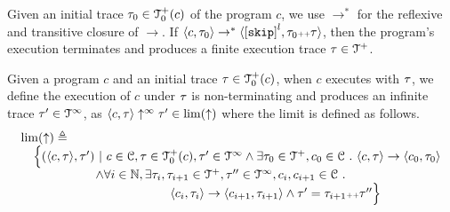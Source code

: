 Given an initial trace $\mathtt{\tau}_0 \in \mathcal{T}^{+}_0(c)$ of the program $c$,
we use $\to^*$ for the reflexive and transitive closure of $\to$. 
If $\config{c, \trace_0} \rightarrow^{*} \config{\clabel{\eskip}^l, \trace_0 \tracecat \trace}$,
then the program's execution terminates and produces a finite execution trace $\mathtt{\tau} \in \mathcal{T}^{+}$.
\\
\begin{defn}
  \label{def:non-terminating}
  Given a program $c$ and an initial trace $\mathtt{\tau} \in \mathcal{T}^{+}_0(c)$,
  when $c$ executes with $\mathtt{\tau}$,  we define the execution of $c$ under $\mathtt{\tau}$ is non-terminating and produces an infinite trace $\mathtt{\tau}' \in \mathcal{T}^{\infty}$, as 
  $\langle c, \mathtt{\tau} \rangle \uparrow^{\infty} \mathtt{\tau}' \in \lim(\uparrow)$
  where the limit is defined as follows.
  \[
    \begin{array}{l}
      \lim(\uparrow) 
      \triangleq 
    \\ \quad
    \Big\{
      (\langle c, \mathtt{\tau} \rangle, \mathtt{\tau}') ~\vert~ 
      c\in \mathcal{C}, \mathtt{\tau} \in \mathcal{T}^{+}_0(c),
      \mathtt{\tau}' \in \mathcal{T}^{\infty} 
      \land \exists \mathtt{\tau}_0 \in \mathcal{T}^{+}, c_0 \in \mathcal{C} ~.~ 
      \langle c, \mathtt{\tau} \rangle \to \langle c_0, \mathtt{\tau}_0 \rangle
      \\ \qquad \qquad \qquad 
      \land \forall i \in \mathbb{N}, \exists \mathtt{\tau}_i, \mathtt{\tau}_{i + 1} \in \mathcal{T}^{+}, \mathtt{\tau}'' \in \mathcal{T}^{\infty}, c_i, c_{i + 1} \in \mathcal{C} ~.~ 
      \\ \qquad \qquad \qquad 
      \qquad \qquad \qquad 
      \langle c_i, \mathtt{\tau}_i \rangle \to \langle c_{i + 1}, \mathtt{\tau}_{i + 1} \rangle 
      \land  \mathtt{\tau}' = \mathtt{\tau}_{i + 1} {\scriptscriptstyle ++} \mathtt{\tau}''
    \Big\}
    \end{array}
  \]
\end{defn}
%
